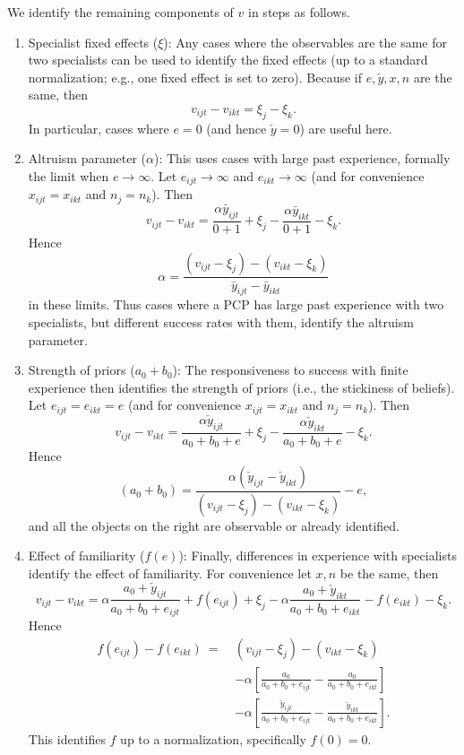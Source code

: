 \documentclass[12pt]{article}
\begin{document}
We identify the remaining components of $v$ in steps as follows.
\begin{enumerate}
    \item Specialist fixed effects ($\xi$):
Any cases where the observables are the same for two specialists can be used to identify the fixed effects (up to a standard normalization; e.g., one fixed effect is set to zero).
Because if $e, \check y, x, n$ are the same, then
$$ v_{ijt} - v_{ikt} = \xi_j - \xi_k . $$
In particular, cases where $e=0$ (and hence $\check y = 0$) are useful here.
    \item Altruism parameter ($\alpha$):
This uses cases with large past experience, formally the limit when $e \rightarrow \infty$.
Let $e_{ijt} \rightarrow \infty$ and $e_{ikt} \rightarrow \infty$
(and for convenience $x_{ijt} = x_{ikt}$ and $n_j = n_k$).
Then
\[ v_{ijt} - v_{ikt} 
= \frac{ \alpha \bar y_{ijt} }{ 0 + 1 } + \xi_j
- \frac{ \alpha \bar y_{ikt} }{ 0 + 1 } - \xi_k .
\]
Hence
\[ \alpha 
= \frac{(v_{ijt} - \xi_j) - (v_{ikt} - \xi_k)}
  {\bar y_{ijt} - \bar y_{ikt}}
\]
in these limits.
Thus cases where a PCP has large past experience with two specialists, but different success rates with them, identify the altruism parameter.
    \item Strength of priors ($a_0 + b_0$):
The responsiveness to success with finite experience then identifies the strength of priors (i.e., the stickiness of beliefs).
Let $e_{ijt} = e_{ikt} = e$
(and for convenience $x_{ijt} = x_{ikt}$ and $n_j = n_k$).
Then
\[ v_{ijt} - v_{ikt} 
= \frac{ \alpha \check y_{ijt}}{ a_0 + b_0 + e } + \xi_j
- \frac{ \alpha \check y_{ikt}}{ a_0 + b_0 + e } - \xi_k .
\]
Hence
\[ (a_0 + b_0) 
= \frac{\alpha (\check y_{ijt} - \check y_{ikt})}
{(v_{ijt} - \xi_j) - (v_{ikt} - \xi_k)} - e ,
\]
and all the objects on the right are observable or already identified.
    \item Effect of familiarity ($f(e)$):
Finally, differences in experience with specialists identify the effect of familiarity.
For convenience let $x, n$ be the same, then
\[ v_{ijt} - v_{ikt} 
= \alpha \frac{a_0 + \check y_{ijt}}{ a_0 + b_0 + e_{ijt} } + f(e_{ijt}) + \xi_j
- \alpha \frac{a_0 + \check y_{ikt}}{ a_0 + b_0 + e_{ikt} } - f(e_{ikt}) - \xi_k .
\]
Hence
\begin{align*}
 f(e_{ijt}) - f(e_{ikt}) 
\ = \  & (v_{ijt} - \xi_j) - (v_{ikt} - \xi_k) \\
& - \alpha \left[ \frac{a_0}{ a_0 + b_0 + e_{ijt} } - \frac{a_0}{ a_0 + b_0 + e_{ikt} } \right] \\
& - \alpha \left[ \frac{\check y_{ijt}}{ a_0 + b_0 + e_{ijt} } - \frac{\check y_{ikt}}{ a_0 + b_0 + e_{ikt} } \right] .
\end{align*}
This identifies $f$ up to a normalization, specifically $f(0) = 0$.


\end{enumerate}
\end{document}
